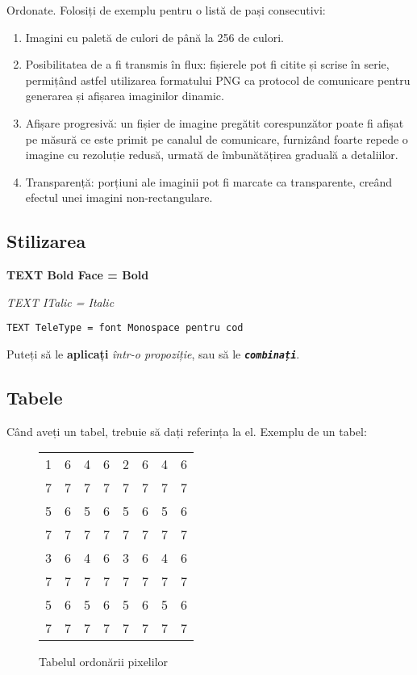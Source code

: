 \documentclass[a4paper,12pt]{report}
\begin{document}
Ordonate. Folosiți de exemplu pentru o listă de pași consecutivi:

\begin{enumerate}
    \item 
        Imagini cu paletă de culori de până la 256 de culori.
    \item 
        Posibilitatea de a fi transmis în flux:
        fișierele pot fi citite și scrise în serie, permițând astfel utilizarea formatului
        PNG ca protocol de comunicare pentru generarea și afișarea imaginilor dinamic.
    \item 
        Afișare progresivă: un fișier de imagine pregătit corespunzător poate fi
        afișat pe măsură ce este primit pe canalul de comunicare,
        furnizând foarte repede o imagine cu rezoluție redusă,
        urmată de îmbunătățirea graduală a detaliilor.
    \item 
        Transparență: porțiuni ale imaginii pot fi marcate ca transparente,
        creând efectul unei imagini non-rectangulare.
\end{enumerate}


\subsection{Stilizarea}

\textbf{TEXT Bold Face = Bold}

\textit{TEXT ITalic = Italic}

\texttt{TEXT TeleType = font Monospace pentru cod}

Puteți să le \textbf{aplicați} \textit{într-o propoziție}, sau să le \texttt{\textit{\textbf{combinați}}}.


\subsection{Tabele}

Când aveți un tabel, trebuie să dați referința la el.
Exemplu de un tabel: 

\begin{figure}[!ht]
\centering
\begin{tabular}{c c c c c c c c}
    1 & 6 & 4 & 6 & 2 & 6 & 4 & 6 \\
    7 & 7 & 7 & 7 & 7 & 7 & 7 & 7 \\
    5 & 6 & 5 & 6 & 5 & 6 & 5 & 6 \\
    7 & 7 & 7 & 7 & 7 & 7 & 7 & 7 \\
    3 & 6 & 4 & 6 & 3 & 6 & 4 & 6 \\
    7 & 7 & 7 & 7 & 7 & 7 & 7 & 7 \\
    5 & 6 & 5 & 6 & 5 & 6 & 5 & 6 \\
    7 & 7 & 7 & 7 & 7 & 7 & 7 & 7 \\
\end{tabular}
\caption{Tabelul ordonării pixelilor}
\label{fig:pixel_order_table}
\end{figure}
\end{document}
